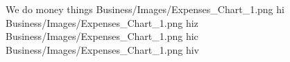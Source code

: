 




\financemodule
{We do money things}
{Business/Images/Expenses_Chart_1.png}
{hi}
{Business/Images/Expenses_Chart_1.png}
{hiz}
{Business/Images/Expenses_Chart_1.png}
{hic}
{Business/Images/Expenses_Chart_1.png}
{hiv}
